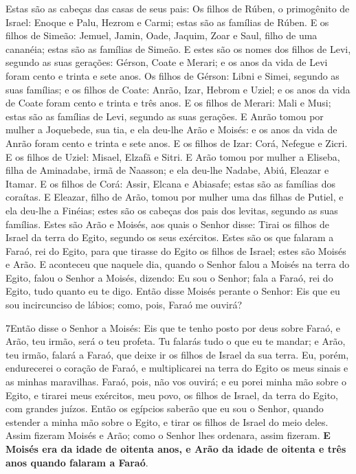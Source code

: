 Estas são as cabeças das casas de seus pais: Os filhos de Rúben,
o primogênito de Israel: Enoque e Palu, Hezrom e Carmi; estas são as
famílias de Rúben. E os filhos de Simeão: Jemuel, Jamin,
Oade, Jaquim, Zoar e Saul, filho de uma cananéia; estas são as
famílias de Simeão. E estes são os nomes dos filhos de Levi,
segundo as suas gerações: Gérson, Coate e Merari; e os anos da vida
de Levi foram cento e trinta e sete anos. Os filhos de
Gérson: Libni e Simei, segundo as suas famílias; e os filhos
de Coate: Anrão, Izar, Hebrom e Uziel; e os anos da vida de Coate
foram cento e trinta e três anos. E os filhos de Merari: Mali
e Musi; estas são as famílias de Levi, segundo as suas gerações.
E Anrão tomou por mulher a Joquebede, sua tia, e ela deu-lhe
Arão e Moisés: e os anos da vida de Anrão foram cento e trinta e
sete anos. E os filhos de Izar: Corá, Nefegue e Zicri.
E os filhos de Uziel: Misael, Elzafã e Sitri. E Arão
tomou por mulher a Eliseba, filha de Aminadabe, irmã de Naasson; e
ela deu-lhe Nadabe, Abiú, Eleazar e Itamar. E os filhos de
Corá: Assir, Elcana e Abiasafe; estas são as famílias dos coraítas.
E Eleazar, filho de Arão, tomou por mulher uma das filhas de
Putiel, e ela deu-lhe a Finéias; estes são os cabeças dos pais dos
levitas, segundo as suas famílias. Estes são Arão e Moisés,
aos quais o Senhor disse: Tirai os filhos de Israel da terra do
Egito, segundo os seus exércitos. Estes são os que falaram a
Faraó, rei do Egito, para que tirasse do Egito os filhos de Israel;
estes são Moisés e Arão. E aconteceu que naquele dia, quando
o Senhor falou a Moisés na terra do Egito, falou o Senhor a
Moisés, dizendo: Eu sou o Senhor; fala a Faraó, rei do Egito, tudo
quanto eu te digo. Então disse Moisés perante o Senhor: Eis
que eu sou incircunciso de lábios; como, pois, Faraó me ouvirá?

\medskip

\lettrine{7} Então disse o Senhor a Moisés: Eis que te tenho
posto por deus sobre Faraó, e Arão, teu irmão, será o teu profeta.
Tu falarás tudo o que eu te mandar; e Arão, teu irmão, falará a
Faraó, que deixe ir os filhos de Israel da sua terra. Eu, porém,
endurecerei o coração de Faraó, e multiplicarei na terra do Egito os
meus sinais e as minhas maravilhas. Faraó, pois, não vos ouvirá;
e eu porei minha mão sobre o Egito, e tirarei meus exércitos, meu
povo, os filhos de Israel, da terra do Egito, com grandes juízos.
Então os egípcios saberão que eu sou o Senhor, quando estender a
minha mão sobre o Egito, e tirar os filhos de Israel do meio deles.
Assim fizeram Moisés e Arão; como o Senhor lhes ordenara, assim
fizeram. \textbf{E Moisés era da idade de oitenta anos, e Arão
da idade de oitenta e três anos quando falaram a Faraó}.

